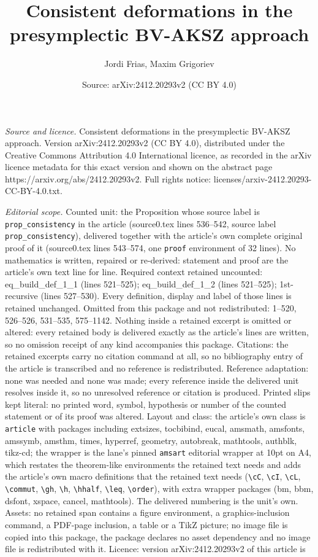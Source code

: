 \documentclass[10pt,a4paper]{amsart}
\title[Consistent deformations in the presymplectic BV-AKSZ approac]{Consistent deformations in the presymplectic BV-AKSZ approach}
\author{Jordi Frias, Maxim Grigoriev}
\date{Source: arXiv:2412.20293v2 (CC BY 4.0)}
\begin{document}
\maketitle

\noindent\emph{Source and licence.} Consistent deformations in the presymplectic BV-AKSZ approach. Version arXiv:2412.20293v2 (CC BY 4.0), distributed under the Creative Commons Attribution 4.0 International licence, as recorded in the arXiv licence metadata for this exact version and shown on the abstract page https://arxiv.org/abs/2412.20293v2. Full rights notice: licenses/arxiv-2412.20293-CC-BY-4.0.txt.\par\smallskip

\noindent\textit{Editorial scope.} Counted unit: the Proposition whose source label is \texttt{prop\_consistency} in the article (source0.tex lines 536--542, source label \texttt{prop\_consistency}), delivered together with the article's own complete original proof of it (source0.tex lines 543--574, one \texttt{proof} environment of 32 lines). No mathematics is written, repaired or re-derived: statement and proof are the article's own text line for line. Required context retained uncounted: eq\_build\_def\_1\_1 (lines 521--525); eq\_build\_def\_1\_2 (lines 521--525); 1st-recursive (lines 527--530). Every definition, display and label of those lines is retained unchanged. Omitted from this package and not redistributed: 1--520, 526--526, 531--535, 575--1142. Nothing inside a retained excerpt is omitted or altered: every retained body is delivered exactly as the article's lines are written, so no omission receipt of any kind accompanies this package. Citations: the retained excerpts carry no citation command at all, so no bibliography entry of the article is transcribed and no reference is redistributed. Reference adaptation: none was needed and none was made; every reference inside the delivered unit resolves inside it, so no unresolved reference or citation is produced. Printed slips kept literal: no printed word, symbol, hypothesis or number of the counted statement or of its proof was altered. Layout and class: the article's own class is \texttt{article} with packages including extsizes, tocbibind, eucal, amsmath, amsfonts, amssymb, amsthm, times, hyperref, geometry, autobreak, mathtools, authblk, tikz-cd; the wrapper is the lane's pinned \texttt{amsart} editorial wrapper at 10pt on A4, which restates the theorem-like environments the retained text needs and adds the article's own macro definitions that the retained text needs (\texttt{\textbackslash cC}, \texttt{\textbackslash cI}, \texttt{\textbackslash cL}, \texttt{\textbackslash commut}, \texttt{\textbackslash gh}, \texttt{\textbackslash h}, \texttt{\textbackslash hhalf}, \texttt{\textbackslash leq}, \texttt{\textbackslash order}), with extra wrapper packages (bm, bbm, dsfont, xspace, cancel, mathtools). The delivered numbering is the unit's own. Assets: no retained span contains a figure environment, a graphics-inclusion command, a PDF-page inclusion, a table or a TikZ picture; no image file is copied into this package, the package declares no asset dependency and no image file is redistributed with it. Licence: version arXiv:2412.20293v2 of this article is 
\end{document}

